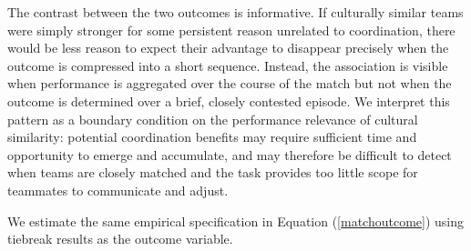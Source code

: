 \documentclass[10pt]{article}
\begin{document}
The contrast between the two outcomes is informative. If culturally similar teams were simply stronger for some persistent reason unrelated to coordination, there would be less reason to expect their advantage to disappear precisely when the outcome is compressed into a short sequence. Instead, the association is visible when performance is aggregated over the course of the match but not when the outcome is determined over a brief, closely contested episode. We interpret this pattern as a boundary condition on the performance relevance of cultural similarity: potential coordination benefits may require sufficient time and opportunity to emerge and accumulate, and may therefore be difficult to detect when teams are closely matched and the task provides too little scope for teammates to communicate and adjust.

We estimate the same empirical specification in Equation (\ref{matchoutcome}) using tiebreak results as the outcome variable.
\end{document}
